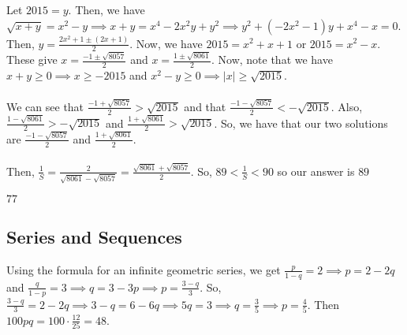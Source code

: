 \documentclass[11pt]{article}
\begin{document}
\begin{sol}
Let $2015=y$. Then, we have $\sqrt{x+y}=x^2-y\implies x+y=x^4-2x^2y+y^2\implies y^2+(-2x^2-1)y+x^4-x=0$. Then, $y=\frac{2x^2+1 \pm (2x+1)}{2}$. Now, we have $2015=x^2+x+1$ or $2015=x^2-x$. These give $x=\frac{-1 \pm \sqrt{8057}}{2}$ and $x=\frac{1 \pm \sqrt{8061}}{2}$. Now, note that we have $x+y\ge 0 \implies x \ge -2015$ and $x^2-y\ge 0\implies |x|\ge \sqrt{2015}$. \\
\\
We can see that $\frac{-1 + \sqrt{8057}}{2}>\sqrt{2015}$ and that $\frac{-1-\sqrt{8057}}{2} < -\sqrt{2015}$. Also, $\frac{1-\sqrt{8061}}{2} > - \sqrt{2015}$ and $\frac{1+\sqrt{8061}}{2} > \sqrt{2015}$. So, we have that our two solutions are $\frac{-1-\sqrt{8057}}{2}$ and $\frac{1+\sqrt{8061}}{2}$. \\
\\
Then, $\frac{1}{S}=\frac{2}{\sqrt{8061}-\sqrt{8057}}=\frac{\sqrt{8061}+\sqrt{8057}}{2}$. So, $89 < \frac{1}{S} < 90$ so our answer is $\boxed{89}$
\end{sol}


\begin{sol}
$\boxed{77}$
\end{sol}
\subsection{Series and Sequences}

\begin{sol}
Using the formula for an infinite geometric series, we get $\frac{p}{1-q}=2\implies p=2-2q$ and $\frac{q}{1-p}=3\implies q=3-3p\implies p=\frac{3-q}{3}$. So, $\frac{3-q}{3}=2-2q\implies 3-q=6-6q\implies 5q=3\implies q =\frac{3}{5}\implies p =\frac{4}{5}$. Then $100pq=100\cdot \frac{12}{25}=\boxed{48}$.
\end{sol}
\end{document}
